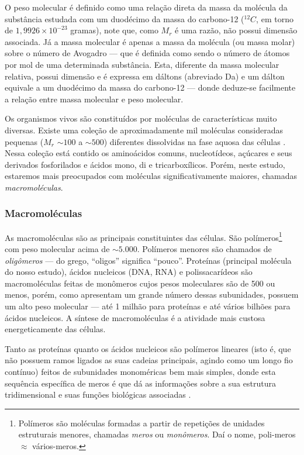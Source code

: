 \documentclass[a4paper,12pt]{article}
\begin{document}
	O peso molecular é definido como uma relação direta da massa da molécula da substância estudada com um duodécimo da massa do carbono-12 ($^{12}C$, em torno de $1,9926\times 10^{-23}$ gramas), note que, como $M_r$ é uma razão, não possui dimensão associada. Já a massa molecular é apenas a massa da molécula (ou massa molar) sobre o número de Avogadro --- que é definida como sendo o número de átomos por mol de uma determinada substância. Esta, diferente da massa molecular relativa, possui dimensão e é expressa em dáltons (abreviado Da) e um dálton equivale a um duodécimo da massa do carbono-12 --- donde deduze-se facilmente a relação entre massa molecular e peso molecular.
	
	Os organismos vivos são constituídos por moléculas de características muito diversas. Existe uma coleção de aproximadamente mil moléculas consideradas pequenas ($M_r$ ${\sim}100$ a ${\sim}500$) diferentes dissolvidas na fase aquosa das células \cite{bioquimicaLehninger}. Nessa coleção está contido os aminoácidos comuns, nucleotídeos, açúcares e seus derivados fosforilados e ácidos mono, di e tricarboxílicos. Porém, neste estudo, estaremos mais preocupados com moléculas significativamente maiores, chamadas \textit{macromoléculas}.
	\subsubsection*{Macromoléculas}
	As macromoléculas são as principais constituintes das células. São polímeros\footnote[1]{Polímeros são moléculas formadas a partir de repetições de unidades estruturais menores, chamadas \textit{meros} ou \textit{monômeros}. Daí o nome, poli-meros $\approx$ vários-meros.} com peso molecular acima de ${\sim}5.000$. Polímeros menores são chamados de \textit{oligômeros} --- do grego, ``oligos'' significa ``pouco''. Proteínas (principal molécula do nosso estudo), ácidos nucleicos (DNA, RNA) e polissacarídeos são macromoléculas feitas de monômeros cujos pesos moleculares são de 500 ou menos, porém, como apresentam um grande número dessas subunidades, possuem um alto peso molecular --- até 1 milhão para proteínas e até vários bilhões para ácidos nucleicos. A síntese de macromoléculas é a atividade mais custosa energeticamente das células.
	
	Tanto as proteínas quanto os ácidos nucleicos são polímeros lineares (isto é, que não possuem ramos ligados as suas cadeias principais, agindo como um longo fio contínuo) feitos de subunidades monoméricas bem mais simples, donde esta sequência específica de meros é que dá as informações sobre a sua estrutura tridimensional e suas funções biológicas associadas \cite{bioquimicaLehninger}.
	
\end{document}

